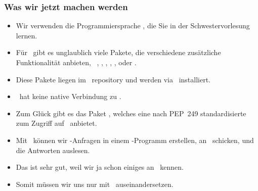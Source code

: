\documentclass[aspectratio=169,mathserif,notheorems]{beamer}%
\begin{document}
\begin{frame}%
\frametitle{Was wir jetzt machen werden}%
\begin{itemize}%
%
%
\item<2-> Wir verwenden die Programmiersprache \python, die Sie in der Schwestervorlesung \cite{programmingWithPython} lernen.%
%
%
%
\item<7-> Für \python\ gibt es unglaublich viele Pakete, die verschiedene zusätzliche Funktionalität anbieten, \DEzB~\numpy, \pandas, \scikitlearn, \scipy, \tensorflow, oder \pytorch.%
%
\item<8-> Diese Pakete liegen im \pypi\ repository und werden via \pip\ installiert.%
%
\item<9-> \python\ hat keine native Verbindung zu \postgresql.%
%
\item<10-> Zum Glück gibt es das Paket \psycopg, welches eine nach PEP~249\cite{PEP249} standardisierte  zum Zugriff auf \postgresql\ anbietet.%
%
\item<11-> Mit \psycopg\ können wir \sql-Anfragen in einem \python-Programm erstellen, an \postgresql\ schicken, und die Antworten auslesen.%
%
\item<12-> Das ist sehr gut, weil wir ja schon einiges an \sql\ kennen.%
%
\item<13-> Somit müssen wir uns nur mit \python\ auseinandersetzen.%
\end{itemize}%
\end{frame}%
%
%
\end{document}
